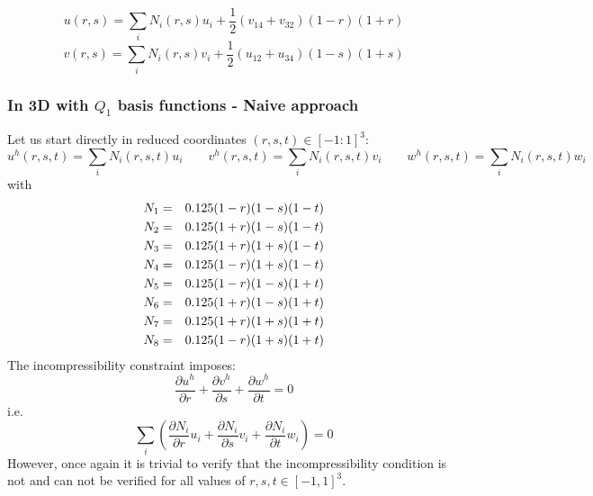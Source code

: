 \[
\boxed{
u(r,s)=\sum_i N_i(r,s) u_i + \frac{1}{2}(v_{14} + v_{32})(1-r)(1+r) 
}
\]
\[
\boxed{
v(r,s)
=\sum_i N_i(r,s) v_i + \frac{1}{2} (u_{12} + u_{34})(1-s)(1+s) 
}
\]


\subsubsection{In 3D with $Q_1$ basis functions - Naive approach}

Let us start directly in reduced coordinates $(r,s,t)\in [-1:1]^3$:
\[
u^h(r,s,t)=\sum_i N_i(r,s,t) u_i
\quad
\quad
v^h(r,s,t)=\sum_i N_i(r,s,t) v_i
\quad
\quad
w^h(r,s,t)=\sum_i N_i(r,s,t) w_i
\]
with
\begin{eqnarray}
N_1&=&0.125(1-r)(1-s)(1-t) \nonumber\\ 
N_2&=&0.125(1+r)(1-s)(1-t)  \nonumber\\ 
N_3&=&0.125(1+r)(1+s)(1-t)  \nonumber\\ 
N_4&=&0.125(1-r)(1+s)(1-t)  \nonumber\\ 
N_5&=&0.125(1-r)(1-s)(1+t)  \nonumber\\ 
N_6&=&0.125(1+r)(1-s)(1+t)  \nonumber\\ 
N_7&=&0.125(1+r)(1+s)(1+t)  \nonumber\\ 
N_8&=&0.125(1-r)(1+s)(1+t)  \nonumber
\end{eqnarray}
The incompressibility constraint imposes:
\[
\frac{\partial u^h}{\partial r}+
\frac{\partial v^h}{\partial s}+
\frac{\partial w^h}{\partial t}=0
\]
i.e.
\[
\sum_i \left(  
\frac{\partial N_i}{\partial r} u_i+
\frac{\partial N_i}{\partial s} v_i+
\frac{\partial N_i}{\partial t} w_i
\right)
=0
\]
However, once again it is trivial to verify that the incompressibility
condition is not and can not be verified for all values of
$r,s,t \in [-1,1]^3$.


